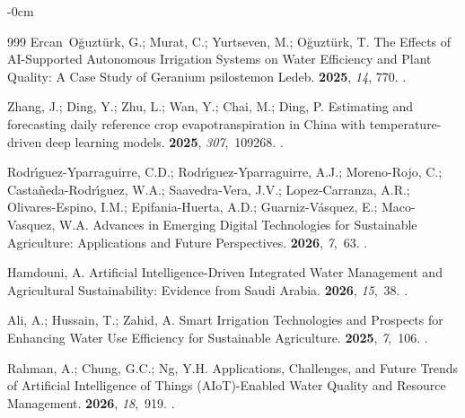 \documentclass[land,review,accept,pdftex,oneauthor]{Definitions/mdpi}
\begin{document}
\begin{adjustwidth}{-\extralength}{0cm}
\begin{thebibliography}{999}
Ercan~O{\u g}uzt{\"u}rk, G.; Murat, C.; Yurtseven, M.; O{\u g}uzt{\"u}rk, T.
\newblock The Effects of AI-Supported Autonomous Irrigation Systems on Water
  Efficiency and Plant Quality: A Case Study of Geranium psilostemon Ledeb.
 {\bf 2025}, {\em 14}, 770.
.

Zhang, J.; Ding, Y.; Zhu, L.; Wan, Y.; Chai, M.; Ding, P.
\newblock Estimating and forecasting daily reference crop evapotranspiration in
  China with temperature-driven deep learning models.
 {\bf 2025}, {\em 307},~109268.
.

Rodr{\'\i}guez-Yparraguirre, C.D.; Rodr{\'\i}guez-Yparraguirre, A.J.;
  Moreno-Rojo, C.; Casta{\~n}eda-Rodr{\'\i}guez, W.A.; Saavedra-Vera, J.V.;
  Lopez-Carranza, A.R.; Olivares-Espino, I.M.; Epifania-Huerta, A.D.;
  Guarniz-V{\'a}squez, E.; Maco-Vasquez, W.A.
\newblock Advances in Emerging Digital Technologies for Sustainable
  Agriculture: Applications and Future Perspectives.
 {\bf 2026}, {\em 7},~63.
.

Hamdouni, A.
\newblock Artificial Intelligence-Driven Integrated Water Management and
  Agricultural Sustainability: Evidence from Saudi Arabia.
 {\bf 2026}, {\em 15},~38.
.

Ali, A.; Hussain, T.; Zahid, A.
\newblock Smart Irrigation Technologies and Prospects for Enhancing Water Use
  Efficiency for Sustainable Agriculture.
 {\bf 2025}, {\em 7},~106.
.

Rahman, A.; Chung, G.C.; Ng, Y.H.
\newblock Applications, Challenges, and Future Trends of Artificial
  Intelligence of Things (AIoT)-Enabled Water Quality and Resource Management.
 {\bf 2026}, {\em 18},~919.
.


\end{thebibliography}
\end{adjustwidth}
\end{document}
